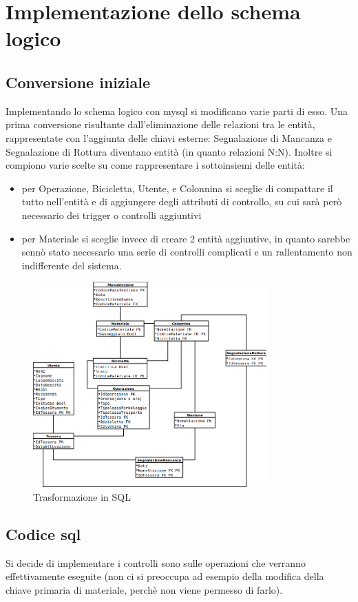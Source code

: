 \documentclass[a4paper,twoside]{article}
\begin{document}
\section{Implementazione dello schema logico}
\subsection{Conversione iniziale}
Implementando lo schema logico con mysql si modificano varie parti di esso.\newline
Una prima conversione risultante dall'eliminazione delle relazioni tra le entità, rappresentate con l'aggiunta delle chiavi esterne: Segnalazione di Mancanza e Segnalazione di Rottura diventano entità (in quanto relazioni N:N).\newline
Inoltre si compiono varie scelte su come rappresentare i sottoinsiemi delle entità:
\begin{itemize}
 \item per Operazione, Bicicletta, Utente, e Colonnina si sceglie di compattare il tutto nell'entità e di aggiungere degli attributi di controllo, su cui sarà però necessario dei trigger o controlli aggiuntivi
 \item per Materiale si sceglie invece di creare 2 entità aggiuntive, in quanto sarebbe sennò stato necessario una serie di controlli complicati e un rallentamento non indifferente del sistema.
\end{itemize}
\begin{figure}[H]
 \centering
  \includegraphics[width=0.8\textwidth]{SQL}
\caption{Trasformazione in SQL}
\end{figure}
\subsection{Codice sql}
Si decide di implementare i controlli sono sulle operazioni che verranno effettivamente eseguite (non ci si preoccupa ad esempio della modifica della chiave primaria di materiale, perchè non viene permesso di farlo).\newline
\end{document}
